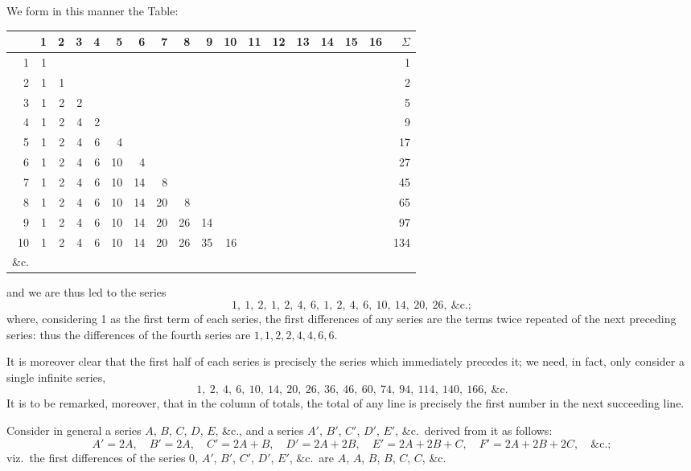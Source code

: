 \documentclass[11pt,a4paper]{book}
\begin{document}
{{We form in this manner the Table:
\begin{center}
\begin{tabular}{r|rrrrrrrrrrrrrrrr|r}
& 1 & 2 & 3 & 4 & 5 & 6 & 7 & 8 & 9 & 10 & 11 & 12 & 13 & 14 & 15 & 16 & $\Sigma$ \\
\hline
1 & 1 & & & & & & & & & & & & & & & & 1 \\
2 & 1 & 1 & & & & & & & & & & & & & & & 2 \\
3 & 1 & 2 & 2 & & & & & & & & & & & & & & 5 \\
4 & 1 & 2 & 4 & 2 & & & & & & & & & & & & & 9 \\
5 & 1 & 2 & 4 & 6 & 4 & & & & & & & & & & & & 17 \\
6 & 1 & 2 & 4 & 6 & 10 & 4 & & & & & & & & & & & 27 \\
7 & 1 & 2 & 4 & 6 & 10 & 14 & 8 & & & & & & & & & & 45 \\
8 & 1 & 2 & 4 & 6 & 10 & 14 & 20 & 8 & & & & & & & & & 65 \\
9 & 1 & 2 & 4 & 6 & 10 & 14 & 20 & 26 & 14 & & & & & & & & 97 \\
10 & 1 & 2 & 4 & 6 & 10 & 14 & 20 & 26 & 35 & 16 & & & & & & & 134 \\
\&c. & & & & & & & & & & & & & & & & 
\end{tabular}
\end{center}
and we are thus led to the series
\[
1,\ 1,\ 2,\ 1,\ 2,\ 4,\ 6,\ 1,\ 2,\ 4,\ 6,\ 10,\ 14,\ 20,\ 26,\ \&\text{c.};
\]
where, considering 1 as the first term of each series, the first differences of any series are the terms twice repeated of the next preceding series: thus the differences of the fourth series are $1, 1, 2, 2, 4, 4, 6, 6$.

It is moreover clear that the first half of each series is precisely the series which immediately precedes it; we need, in fact, only consider a single infinite series,
\[
1,\ 2,\ 4,\ 6,\ 10,\ 14,\ 20,\ 26,\ 36,\ 46,\ 60,\ 74,\ 94,\ 114,\ 140,\ 166,\ \&\text{c.}
\]
It is to be remarked, moreover, that in the column of totals, the total of any line is precisely the first number in the next succeeding line.

Consider in general a series $A$, $B$, $C$, $D$, $E$, \&c., and a series $A'$, $B'$, $C'$, $D'$, $E'$, \&c.\ derived from it as follows:
\[
A' = 2A, \quad B' = 2A, \quad C' = 2A + B, \quad D' = 2A + 2B, \quad E' = 2A + 2B + C, \quad F' = 2A + 2B + 2C, \quad \&\text{c.};
\]
viz.\ the first differences of the series $0$, $A'$, $B'$, $C'$, $D'$, $E'$, \&c.\ are $A$, $A$, $B$, $B$, $C$, $C$, \&c.

}}
\end{document}
